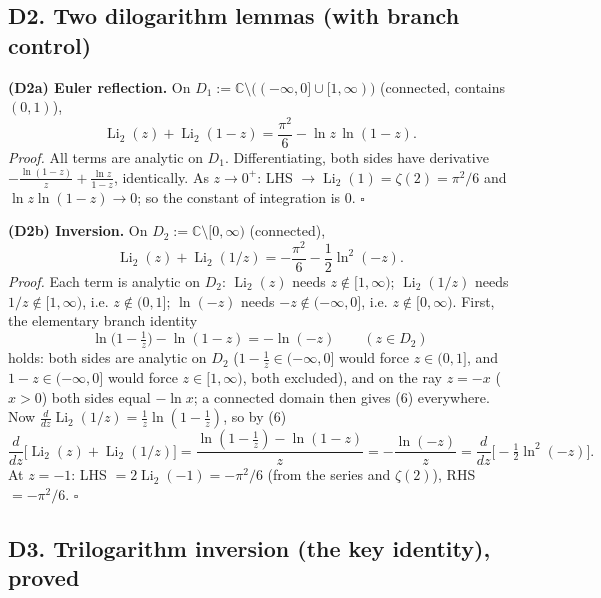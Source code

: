 \documentclass[11pt]{article}
\theoremstyle{remark}
\begin{document}
\subsection*{D2. Two dilogarithm lemmas (with branch control)}

\textbf{(D2a) Euler reflection.} On $D_1:=\mathbb{C}\setminus\big((-\infty,0]\cup[1,\infty)\big)$ (connected, contains $(0,1)$),
\begin{equation*}
\operatorname{Li}_2(z)+\operatorname{Li}_2(1-z)=\frac{\pi^2}{6}-\ln z\,\ln(1-z). \tag{4}
\end{equation*}
\emph{Proof.} All terms are analytic on $D_1$. Differentiating, both sides have derivative $-\tfrac{\ln(1-z)}z+\tfrac{\ln z}{1-z}$, identically. As $z\to0^+$: LHS $\to \operatorname{Li}_2(1)=\zeta(2)=\pi^2/6$ and $\ln z\ln(1-z)\to0$; so the constant of integration is $0$. $\square$

\textbf{(D2b) Inversion.} On $D_2:=\mathbb{C}\setminus[0,\infty)$ (connected),
\begin{equation*}
\operatorname{Li}_2(z)+\operatorname{Li}_2(1/z)=-\frac{\pi^2}{6}-\frac12\ln^2(-z). \tag{5}
\end{equation*}
\emph{Proof.} Each term is analytic on $D_2$: $\operatorname{Li}_2(z)$ needs $z\notin[1,\infty)$; $\operatorname{Li}_2(1/z)$ needs $1/z\notin[1,\infty)$, i.e. $z\notin(0,1]$; $\ln(-z)$ needs $-z\notin(-\infty,0]$, i.e. $z\notin[0,\infty)$. First, the elementary branch identity
\begin{equation*}
\ln\!\big(1-\tfrac1z\big)-\ln(1-z)=-\ln(-z)\qquad(z\in D_2) \tag{6}
\end{equation*}
holds: both sides are analytic on $D_2$ ($1-\tfrac1z\in(-\infty,0]$ would force $z\in(0,1]$, and $1-z\in(-\infty,0]$ would force $z\in[1,\infty)$, both excluded), and on the ray $z=-x$ ($x>0$) both sides equal $-\ln x$; a connected domain then gives (6) everywhere. Now $\tfrac{d}{dz}\operatorname{Li}_2(1/z)=\tfrac1z\ln(1-\tfrac1z)$, so by (6)
\[
\frac{d}{dz}\Big[\operatorname{Li}_2(z)+\operatorname{Li}_2(1/z)\Big]=\frac{\ln(1-\tfrac1z)-\ln(1-z)}{z}=-\frac{\ln(-z)}{z}=\frac{d}{dz}\Big[-\tfrac12\ln^2(-z)\Big].
\]
At $z=-1$: LHS $=2\operatorname{Li}_2(-1)=-\pi^2/6$ (from the series and $\zeta(2)$), RHS $=-\pi^2/6$. $\square$

\subsection*{D3. Trilogarithm inversion (the key identity), proved}
\end{document}
